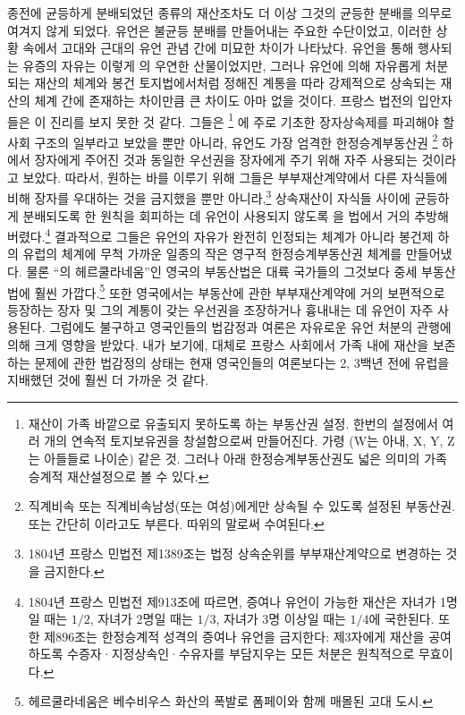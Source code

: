 종전에 균등하게 분배되었던 종류의 재산조차도
더 이상 그것의 균등한 분배를 의무로 여겨지 않게 되었다.
유언은 불균등 분배를 만들어내는 주요한 수단이었고,
이러한 상황 속에서
고대와 근대의 유언 관념 간에 미묘한 차이가 나타났다.
유언을 통해 행사되는 유증의 자유는 이렇게 의 우연한 산물이었지만,
그러나
유언에 의해 자유롭게 처분되는 재산의 체계와
봉건 토지법에서처럼
정해진 계통을 따라 강제적으로 상속되는 재산의 체계
간에 존재하는 차이만큼 큰 차이도 아마 없을 것이다.
프랑스 법전의 입안자들은 이 진리를 보지 못한 것 같다.
그들은
%
\footnote{재산이 가족 바깥으로 유출되지 못하도록 하는 부동산권 설정.
  한번의 설정에서 여러 개의 연속적 토지보유권을 창설함으로써 만들어진다.
  가령  (W는 아내, X, Y, Z는 아들들로 나이순) 같은 것.
  그러나 아래 한정승계부동산권도 넓은 의미의 가족승계적 재산설정으로 볼 수 있다.
}%
에 주로 기초한
장자상속제를
파괴해야 할 사회 구조의 일부라고
보았을 뿐만 아니라,
유언도
가장 엄격한 한정승계부동산권%
\footnote{직계비속 또는 직계비속남성(또는 여성)에게만 상속될 수 있도록
  설정된 부동산권.
   또는 간단히 이라고도 부른다.
   따위의 말로써 수여된다.
  }
하에서 장자에게 주어진 것과
동일한 우선권을
장자에게
주기 위해 자주 사용되는 것이라고 보았다.
따라서,
원하는 바를 이루기 위해 그들은
부부재산계약에서 다른 자식들에 비해 장자를 우대하는 것을 금지했을
뿐만 아니라,\footnote{%
  1804년 프랑스 민법전 제1389조는
  법정 상속순위를 부부재산계약으로 변경하는 것을 금지한다. }
상속재산이 자식들 사이에 균등하게 분배되도록 한 원칙을 회피하는 데
유언이
사용되지 않도록
을 법에서 거의 추방해버렸다.\footnote{%
  1804년 프랑스 민법전 제913조에 따르면,
  증여나 유언이 가능한 재산은
  자녀가 1명일 때는 $1/2$,
  자녀가 2명일 때는 $1/3$,
  자녀가 3명 이상일 때는 $1/4$에 국한된다.
  또한 제896조는
  한정승계적 성격의 증여나 유언을 금지한다:
  제3자에게 재산을 공여하도록
  수증자^^b7지정상속인^^b7수유자를
  부담지우는 모든 처분은 원칙적으로 무효이다. }
결과적으로 그들은
유언의 자유가 완전히 인정되는 체계가 아니라
봉건제 하의 유럽의 체계에 무척 가까운
일종의 작은 영구적 한정승계부동산권 체계를 만들어냈다.
물론
``의 헤르쿨라네움''인 영국의 부동산법은
대륙 국가들의 그것보다 중세 부동산법에 훨씬 가깝다.\footnote{%
  헤르쿨라네움은 베수비우스 화산의 폭발로 폼페이와 함께 매몰된 고대 도시.}
또한 영국에서는
부동산에 관한 부부재산계약에 거의 보편적으로 등장하는
장자 및 그의 계통이 갖는 우선권을 조장하거나 흉내내는 데
유언이
자주 사용된다.
그럼에도 불구하고 영국인들의 법감정과 여론은
자유로운 유언 처분의 관행에 의해 크게 영향을 받았다.
내가 보기에,
대체로 프랑스 사회에서
가족 내에 재산을 보존하는 문제에 관한
법감정의 상태는
현재 영국인들의 여론보다는 2, 3백년 전에 유럽을 지배했던 것에
훨씬 더 가까운 것 같다.

